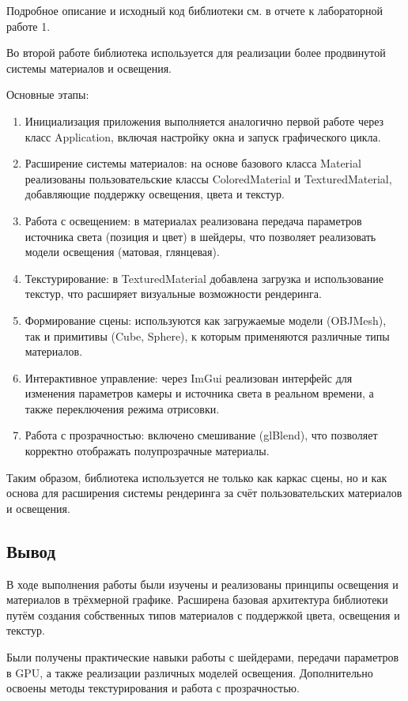 \documentclass[a4paper,12pt]{article}
\begin{document}
Подробное описание и исходный код библиотеки см. в отчете к лабораторной работе 1.

Во второй работе библиотека используется для реализации более продвинутой системы материалов и освещения.

Основные этапы:
\begin {enumerate}
\item Инициализация приложения выполняется аналогично первой работе через класс Application, включая настройку окна и запуск графического цикла.
\item Расширение системы материалов: на основе базового класса Material реализованы пользовательские классы ColoredMaterial и TexturedMaterial, добавляющие поддержку освещения, цвета и текстур.
\item Работа с освещением: в материалах реализована передача параметров источника света (позиция и цвет) в шейдеры, что позволяет реализовать модели освещения (матовая, глянцевая).
\item Текстурирование: в TexturedMaterial добавлена загрузка и использование текстур, что расширяет визуальные возможности рендеринга.
\item Формирование сцены: используются как загружаемые модели (OBJMesh), так и примитивы (Cube, Sphere), к которым применяются различные типы материалов.
\item Интерактивное управление: через ImGui реализован интерфейс для изменения параметров камеры и источника света в реальном времени, а также переключения режима отрисовки.
\item Работа с прозрачностью: включено смешивание (glBlend), что позволяет корректно отображать полупрозрачные материалы.
\end {enumerate}

Таким образом, библиотека используется не только как каркас сцены, но и как основа для расширения системы рендеринга за счёт пользовательских материалов и освещения.
\subsection*{Вывод}
В ходе выполнения работы были изучены и реализованы принципы освещения и материалов в трёхмерной графике. Расширена базовая архитектура библиотеки путём создания собственных типов материалов с поддержкой цвета, освещения и текстур.

Были получены практические навыки работы с шейдерами, передачи параметров в GPU, а также реализации различных моделей освещения. Дополнительно освоены методы текстурирования и работа с прозрачностью.
\end{document}
